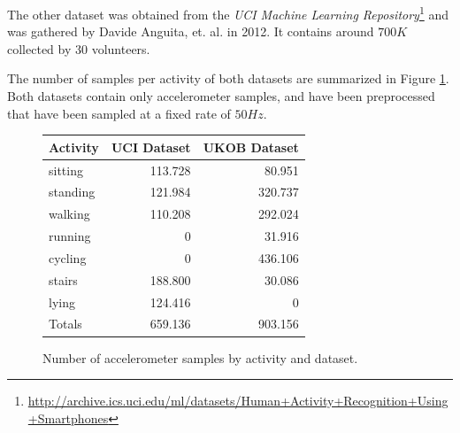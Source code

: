 %
%

The other dataset was obtained from the {\it UCI Machine Learning
  Repository}\footnote{\url{http://archive.ics.uci.edu/ml/datasets/Human+Activity+Recognition+Using+Smartphones}}
and was gathered by Davide Anguita, et. al. \cite{Anguita} in 2012.
It contains around $700K$ collected by 30 volunteers.

The number of samples per activity of both datasets are summarized in
Figure \ref{fig:har_datasets}. Both datasets contain only
accelerometer samples, and have been preprocessed that have been
sampled at a fixed rate of $50Hz$.

\begin{figure}
\centering
\begin{tabular}{|l|r|r|} \hline
Activity  & UCI Dataset & UKOB Dataset \\ \hline
sitting   & 113.728     & 80.951        \\
standing  & 121.984     & 320.737       \\
walking   & 110.208     & 292.024       \\
running   & 0           & 31.916        \\
cycling   & 0           & 436.106       \\
stairs    & 188.800     & 30.086        \\
lying     & 124.416     & 0            \\ \hline \hline
Totals    & 659.136     & 903.156       \\ \hline
\end{tabular}

\caption{Number of accelerometer samples by activity and dataset.}
\label{fig:har_datasets}
\end{figure}

